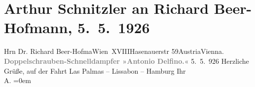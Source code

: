 

         
         \renewcommand{\erwaehntePersonen}{Personen: Richard Beer-Hofmann}
         \renewcommand{\erwaehnteOrte}{Orte: Hamburg, Hasenauerstraße, Las Palmas de Gran Canaria, Lissabon, Mittelmeer, Wien, XVIII., Währing, Österreich}
         \renewcommand{\erwaehnteWerke}{}
               \section[Arthur Schnitzler an Richard Beer-Hofmann, 5. 5. 1926]{ Arthur Schnitzler an Richard Beer-Hofmann, 5. 5. 1926}\nopagebreak{}\rehead{ }\begin{ledgroupsized}[t]{13cm}\normalsize\beginnumbering{} \toendnotes[C]{\smallbreak\pagebreak[2]} 
\pstart{}{\pb}Hrn \introOben{}Dr.\introOben{} Richard
                     Beer-Hofma{\geminationn}\pend{}\pstart{}Wien XVIII\pend{}\pstart{}Hasenauerstr 59\pend{}\pstart{}Austria\pend{}\pstart{}Vienna.\pend{}{\bigskip}\pstart
           \noindent{}\centering{}{\pb}\textcolor{gray}{\textbf{Doppelschrauben-Schnelldampfer »Antonio Delfino.«}}\pend
           \pstart
           {\pb}5. 5. 926\pend
           \pstart
           Herzliche Grüße, auf der Fahrt Las Palmas – Lissabon – Hamburg\pend
           \pstart
           Ihr{\\[\baselineskip]}\spacefill\mbox{A.}\pend
           \leftskip=0em{}
         
         \endnumbering{}\end{ledgroupsized}  \newcommand{\dateiname}{L02473}\newcommand{\titel}{Arthur Schnitzler an Richard Beer-Hofmann, 5. 5. 1926}\newcommand{\editorInnen}{Martin Anton Müller und Gerd-Hermann Susen}
      